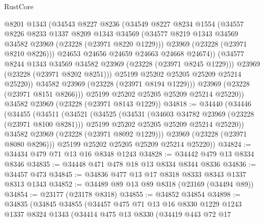 \begin{lexlean}{RustCore}
\begin{coremodule}
                  @8201
                  @1343
                  (@34543
                    @8227
                    @8236
                    (@34549
                      @8227
                      @8234
                      @1554
                      (@34557
                        @8226
                        @8233
                        @1337
                        @8209
                        @1343
                        @34569
                        (@34577 @8219 @1343 @34569 @34582 @23969 (@23228 (@23971 @8220 @1229)))
                        @23969
                        (@23228 (@23971 @8210 @8226)))
                      @24653
                      @24656
                      @24659
                      @24663
                      @24668
                      @24674))
                  (@34577 @8244 @1343 @34569 @34582 @23969 (@23228 (@23971 @8245 @1229)))
                  @23969
                  (@23228 (@23971 @8202 @8251)))
                @25199
                @25202
                @25205
                @25209
                @25214
                @25220))
            @34582
            @23969
            (@23228 (@23971 @8194 @1229)))
          @23969
          (@23228 (@23971 @8151 @8266)))
        @25199
        @25202
        @25205
        @25209
        @25214
        @25220))
    @34582
    @23969
    (@23228 (@23971 @8143 @1229))
@34818 := @34440
    (@34446
      (@34455
        (@34511
          (@34521
            (@34525
              (@34531
                (@34603 @34782 @23969 (@23228 (@23971 @8100 @8281)))
                @25199
                @25202
                @25205
                @25209
                @25214
                @25220))
            @34582
            @23969
            (@23228 (@23971 @8092 @1229)))
          @23969
          (@23228 (@23971 @8080 @8296)))
        @25199
        @25202
        @25205
        @25209
        @25214
        @25220))
@34824 := @34434 @479 @71 @13 @16 @8348 @1243
@34828 := @34442 @479 @13 @8334 @8346
@34835 := @34448 @471 @478 @18 @13 @8334 @8344 @8336
@34836 := @34457 @473
@34845 := @34836 @477 @13 @17 @8318 @8333 @8343 @1337 @8313 @1343
@34852 := @34489 @89 @13 @89 @8318 (@23169 (@34494 @89))
@34854 := @23177 (@23178 @8318)
@34855 := @34852 @34854
@34898 := @34835
    (@34845
      @34855
      (@34457
        @475
        @71
        @13
        @16
        @8330
        @1229
        @1243
        @1337
        @8324
        @1343
        (@34414
          @475
          @13
          @8330
          (@34419
            @443
            @72
            @17

\end{coremodule}
\end{lexlean}
